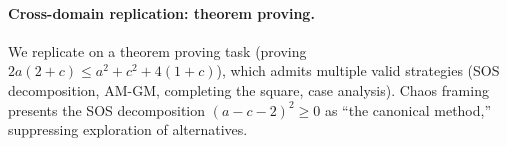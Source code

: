 \documentclass[10pt,twocolumn]{article}
\begin{document}
\paragraph{Cross-domain replication: theorem proving.}
We replicate on a theorem proving task (proving $2a(2+c) \leq a^2 + c^2 + 4(1+c)$), which admits multiple valid strategies (SOS decomposition, AM-GM, completing the square, case analysis).
Chaos framing presents the SOS decomposition $(a-c-2)^2 \geq 0$ as ``the canonical method,'' suppressing exploration of alternatives.

\begin{table}[t]
\centering
\caption{Behavioral quality on theorem proving (0--3 rubric, $n=30$ per cell, 10 prompts $\times$ 3 temperature seeds). Chaos framing suppresses proof strategy diversity; IT models show larger effects.}
\label{tab:theorem}
\small
{}
\end{table}
\end{document}
